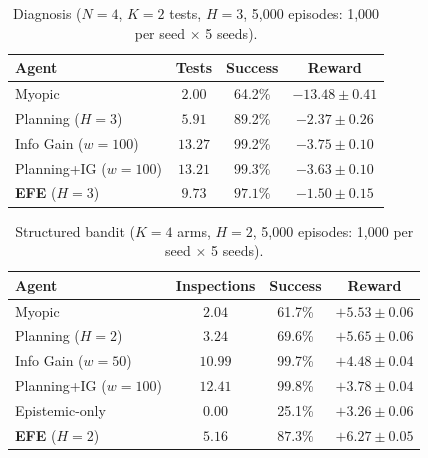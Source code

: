 \documentclass{article}
\begin{document}
\begin{table}[h]
\centering
\caption{Diagnosis ($N{=}4$, $K{=}2$ tests, $H{=}3$, 5{,}000 episodes: 1{,}000 per seed $\times$ 5 seeds).}
\begin{small}
\begin{tabular}{lccc}
\toprule
Agent & Tests & Success & Reward \\
\midrule
Myopic & $2.00$ & 64.2\% & $-13.48 \pm 0.41$ \\
Planning ($H{=}3$) & $5.91$ & 89.2\% & $-2.37 \pm 0.26$ \\
Info Gain ($w{=}100$) & $13.27$ & 99.2\% & $-3.75 \pm 0.10$ \\
Planning+IG ($w{=}100$) & $13.21$ & 99.3\% & $-3.63 \pm 0.10$ \\
\textbf{EFE} ($H{=}3$) & $\mathbf{9.73}$ & $\mathbf{97.1\%}$ & $\mathbf{-1.50 \pm 0.15}$ \\
\bottomrule
\end{tabular}
\end{small}
\end{table}

\begin{table}[h]
\centering
\caption{Structured bandit ($K{=}4$ arms, $H{=}2$, 5{,}000 episodes: 1{,}000 per seed $\times$ 5 seeds).}
\begin{small}
\begin{tabular}{lccc}
\toprule
Agent & Inspections & Success & Reward \\
\midrule
Myopic & $2.04$ & 61.7\% & $+5.53 \pm 0.06$ \\
Planning ($H{=}2$) & $3.24$ & 69.6\% & $+5.65 \pm 0.06$ \\
Info Gain ($w{=}50$) & $10.99$ & 99.7\% & $+4.48 \pm 0.04$ \\
Planning+IG ($w{=}100$) & $12.41$ & 99.8\% & $+3.78 \pm 0.04$ \\
Epistemic-only & $0.00$ & 25.1\% & $+3.26 \pm 0.06$ \\
\textbf{EFE} ($H{=}2$) & $\mathbf{5.16}$ & $\mathbf{87.3\%}$ & $\mathbf{+6.27 \pm 0.05}$ \\
\bottomrule
\end{tabular}
\end{small}
\end{table}
\end{document}
